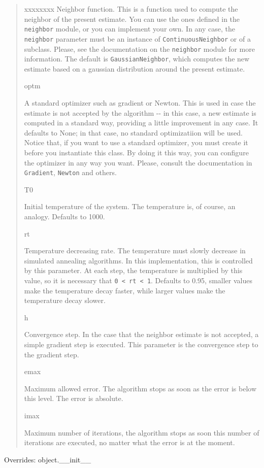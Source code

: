 \begin{boxedminipage}{\funcwidth}
\begin{quote}
\begin{Ventry}{xxxxxxxx}
Neighbor function. This is a function used to compute the neighbor
of the present estimate. You can use the ones defined in the
\texttt{neighbor} module, or you can implement your own. In any case, the
\texttt{neighbor} parameter must be an instance of \texttt{ContinuousNeighbor}
or of a subclass. Please, see the documentation on the \texttt{neighbor}
module for more information. The default is \texttt{GaussianNeighbor},
which computes the new estimate based on a gaussian distribution
around the present estimate.
          \item[optm]


A standard optimizer such as gradient or Newton. This is used in
case the estimate is not accepted by the algorithm -{}- in this case,
a new estimate is computed in a standard way, providing a little
improvement in any case. It defaults to None; in that case, no
standard optimizatiion will be used. Notice that, if you want to use
a standard optimizer, you must create it before you instantiate this
class. By doing it this way, you can configure the optimizer in any
way you want. Please, consult the documentation in \texttt{Gradient},
\texttt{Newton} and others.
          \item[T0]


Initial temperature of the system. The temperature is, of course, an
analogy. Defaults to 1000.
          \item[rt]


Temperature decreasing rate. The temperature must slowly decrease in
simulated annealing algorithms. In this implementation, this is
controlled by this parameter. At each step, the temperature is
multiplied by this value, so it is necessary that \texttt{0 < rt < 1}.
Defaults to 0.95, smaller values make the temperature decay faster,
while larger values make the temperature decay slower.
          \item[h]


Convergence step. In the case that the neighbor estimate is not
accepted, a simple gradient step is executed. This parameter is the
convergence step to the gradient step.
          \item[emax]


Maximum allowed error. The algorithm stops as soon as the error is
below this level. The error is absolute.
          \item[imax]


Maximum number of iterations, the algorithm stops as soon this
number of iterations are executed, no matter what the error is at
the moment.
        \end{Ventry}

      \end{quote}

      Overrides: object.\_\_init\_\_

    \end{boxedminipage}

